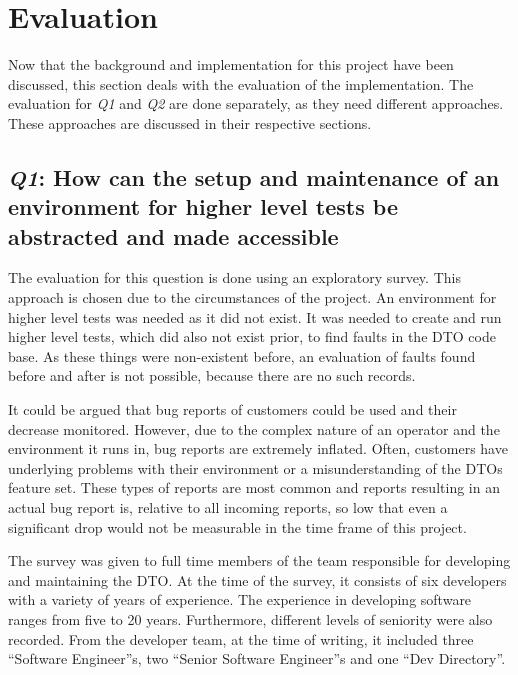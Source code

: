 \chapter{Evaluation}\label{ch:evaluation}

Now that the background and implementation for this project have been discussed, this section deals with the evaluation of the implementation.
The evaluation for \textit{Q1} and \textit{Q2} are done separately, as they need different approaches.
These approaches are discussed in their respective sections.

\section{\textit{Q1}: How can the setup and maintenance of an environment for higher level tests be abstracted and made accessible}\label{sec:textit{q1}:-how-can-the-setup-and-maintenance-of-an-environment-for-higher-level-tests-be-abstracted-and-made-accessible?}

The evaluation for this question is done using an exploratory survey.
This approach is chosen due to the circumstances of the project.
An environment for higher level tests was needed as it did not exist.
It was needed to create and run higher level tests, which did also not exist prior, to find faults in the DTO code base.
As these things were non-existent before, an evaluation of faults found before and after is not possible, because there are no such records.

It could be argued that bug reports of customers could be used and their decrease monitored.
However, due to the complex nature of an operator and the environment it runs in, bug reports are extremely inflated.
Often, customers have underlying problems with their environment or a misunderstanding of the DTOs feature set.
These types of reports are most common and reports resulting in an actual bug report is, relative to all incoming reports, so low that even a significant drop would not be measurable in the time frame of this project.

The survey was given to full time members of the team responsible for developing and maintaining the DTO.
At the time of the survey, it consists of six developers with a variety of years of experience.
The experience in developing software ranges from five to 20 years.
Furthermore, different levels of seniority were also recorded.
From the developer team, at the time of writing, it included three ``Software Engineer''s, two ``Senior Software Engineer''s and one ``Dev Directory''.

